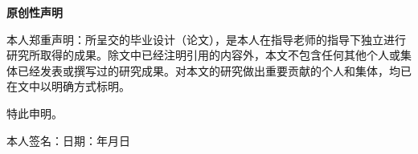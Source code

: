 %
%
%
%
%
%


\pagestyle{originality}
\topskip=0pt

\newcommand{\circled}[2][]{\tikz[baseline=(char.base)]
  {\node[shape = circle, draw, inner sep = 1pt]
  (char) {\phantom{\ifblank{#1}{#2}{#1}}};
  \node at (char.center) {\makebox[0pt][c]{#2}};}}
\robustify{\circled}

\setlength{\parskip}{0.4em}
\renewcommand{\baselinestretch}{1.41}

\vspace*{-6mm}

\begin{center}
  \heiti{}\textbf{原创性声明}
\end{center}


本人郑重声明：所呈交的毕业设计（论文），是本人在指导老师的指导下独立进行研究所取得的成果。除文中已经注明引用的内容外，本文不包含任何其他个人或集体已经发表或撰写过的研究成果。对本文的研究做出重要贡献的个人和集体，均已在文中以明确方式标明。

特此申明。

\vspace{13mm}

\begin{flushright}
  本人签名：\hspace{40mm}日\hspace{2.5mm}期：\hspace{13mm}年\hspace{8mm}月\hspace{8mm}日
\end{flushright}

